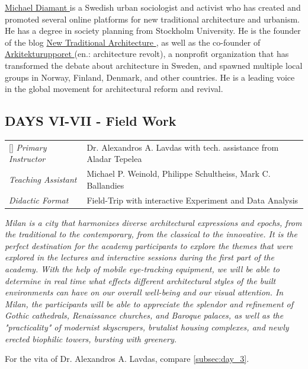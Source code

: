 \documentclass{article}
\begin{document}
\href{https://newtrad.org/aboutme/}{Michael Diamant \ExternalLink} is a Swedish urban sociologist and activist who has created and promoted several online platforms for new traditional architecture and urbanism. He has a degree in society planning from Stockholm University. He is the founder of the blog \href{https://newtrad.org/}{New Traditional Architecture \ExternalLink}, as well as the co-founder of \href{https://www.arkitekturupproret.se}{Arkitekturupporet \ExternalLink} (en.: architecture revolt), a nonprofit organization that has  transformed the debate about architecture in Sweden, and spawned multiple local groups in Norway, Finland, Denmark, and other countries. He is a leading voice in the global movement for architectural reform and revival.

\subsection{DAYS VI-VII - Field Work}

\begin{NiceTabular}{W{l}{3cm}l}[]
\textit{Primary Instructor} & Dr. Alexandros A. Lavdas with tech. assistance from Aladar Tepelea \\
\textit{Teaching Assistant} & Michael P. Weinold, Philippe Schultheiss, Mark C. Ballandies \\
\textit{Didactic Format} & Field-Trip with interactive Experiment and Data Analysis
\end{NiceTabular}

\textit{Milan is a city that harmonizes diverse architectural expressions and epochs, from the traditional to the contemporary, from the classical to the innovative. It is the perfect destination for the academy participants to explore the themes that were explored in the lectures and interactive sessions during the first part of the academy. With the help of mobile eye-tracking equipment, we will be able to determine in real time what effects different architectural styles of the built environments can have on our overall well-being and our visual attention. In Milan, the participants will be able to appreciate the splendor and refinement of Gothic cathedrals, Renaissance churches, and Baroque palaces, as well as the "practicality" of modernist skyscrapers, brutalist housing complexes, and newly erected biophilic towers, bursting with greenery. }

For the vita of Dr. Alexandros A. Lavdas, compare \cref{subsec:day_3}.
\end{document}
